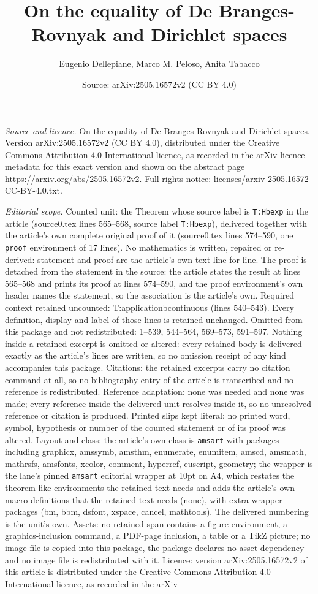 \documentclass[10pt,a4paper]{amsart}
\title[On the equality of De Branges-Rovnyak and Dirichlet spaces]{On the equality of De Branges-Rovnyak and Dirichlet spaces}
\author{Eugenio Dellepiane, Marco M. Peloso, Anita Tabacco}
\date{Source: arXiv:2505.16572v2 (CC BY 4.0)}
\begin{document}
\maketitle

\noindent\emph{Source and licence.} On the equality of De Branges-Rovnyak and Dirichlet spaces. Version arXiv:2505.16572v2 (CC BY 4.0), distributed under the Creative Commons Attribution 4.0 International licence, as recorded in the arXiv licence metadata for this exact version and shown on the abstract page https://arxiv.org/abs/2505.16572v2. Full rights notice: licenses/arxiv-2505.16572-CC-BY-4.0.txt.\par\smallskip

\noindent\textit{Editorial scope.} Counted unit: the Theorem whose source label is \texttt{T:Hbexp} in the article (source0.tex lines 565--568, source label \texttt{T:Hbexp}), delivered together with the article's own complete original proof of it (source0.tex lines 574--590, one \texttt{proof} environment of 17 lines). No mathematics is written, repaired or re-derived: statement and proof are the article's own text line for line. The proof is detached from the statement in the source: the article states the result at lines 565--568 and prints its proof at lines 574--590, and the proof environment's own header names the statement, so the association is the article's own. Required context retained uncounted: T:applicationbcontinuous (lines 540--543). Every definition, display and label of those lines is retained unchanged. Omitted from this package and not redistributed: 1--539, 544--564, 569--573, 591--597. Nothing inside a retained excerpt is omitted or altered: every retained body is delivered exactly as the article's lines are written, so no omission receipt of any kind accompanies this package. Citations: the retained excerpts carry no citation command at all, so no bibliography entry of the article is transcribed and no reference is redistributed. Reference adaptation: none was needed and none was made; every reference inside the delivered unit resolves inside it, so no unresolved reference or citation is produced. Printed slips kept literal: no printed word, symbol, hypothesis or number of the counted statement or of its proof was altered. Layout and class: the article's own class is \texttt{amsart} with packages including graphicx, amssymb, amsthm, enumerate, enumitem, amscd, amsmath, mathrsfs, amsfonts, xcolor, comment, hyperref, euscript, geometry; the wrapper is the lane's pinned \texttt{amsart} editorial wrapper at 10pt on A4, which restates the theorem-like environments the retained text needs and adds the article's own macro definitions that the retained text needs (none), with extra wrapper packages (bm, bbm, dsfont, xspace, cancel, mathtools). The delivered numbering is the unit's own. Assets: no retained span contains a figure environment, a graphics-inclusion command, a PDF-page inclusion, a table or a TikZ picture; no image file is copied into this package, the package declares no asset dependency and no image file is redistributed with it. Licence: version arXiv:2505.16572v2 of this article is distributed under the Creative Commons Attribution 4.0 International licence, as recorded in the arXiv 
\end{document}
